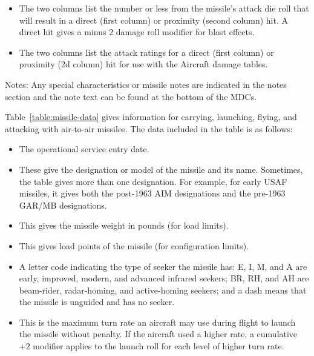 {\begin{itemize}
    \item {} The two columns list the number or less from the missile's attack die roll that will result in a direct (first column) or proximity (second column) hit. A direct hit gives a minus 2 damage roll modifier for blast effects.

    \item {} The two columns list the attack ratings for a direct (first column) or  proximity (2d column) hit for use with the Aircraft damage tables.

\end{itemize}

Notes: Any special characteristics or missile notes are indicated in the notes section and the note text can be found at the bottom of the MDCs.

}{
Table~\ref{table:missile-data} gives information for carrying, launching, flying, and attacking with air-to-air missiles. The data included in the table is as follows:

\begin{itemize}

    \item {} The operational service entry date.
    
    \item {} These give the designation or model of the missile and its name. Sometimes, the table gives more than one designation. For example, for early USAF missiles, it gives both the post-1963 AIM designations and the pre-1963 GAR/MB designations.

    \item {} This gives the missile weight in pounds (for load limits).

    \item {} This gives load points of the missile (for configuration limits).

    \item {} A letter code indicating the type of seeker the missile has: E, I, M, and A are early, improved, modern, and advanced infrared seekers; BR, RH, and AH are beam-rider, radar-homing, and active-homing seekers; and a dash means that the missile is unguided and has no seeker.

    \item {} This is the maximum turn rate an aircraft may use during flight to launch the missile without penalty. If the aircraft used a higher rate, a cumulative $+2$ modifier applies to the launch roll for each level of higher turn rate.


\end{itemize}}
